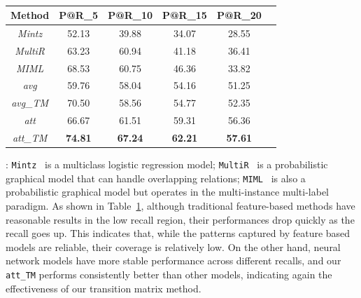 \begin{table}
\centering
\small{
\begin{tabular}{|c|c|c|c|c|c|}
\hline
\textbf{Method}							& \textbf{P@R\_5} 		& \textbf{P@R\_10} 			& \textbf{P@R\_15} & \textbf{P@R\_20} \\
\hline
\textit{Mintz} 							&52.13	&39.88	&34.07	&28.55 	\\
\hline
\textit{MultiR} 						&63.23	&60.94	&41.18	&36.41 	\\
\hline
\textit{MIML} 							&68.53	&60.75	&46.36	&33.82 	\\
\hline
\textit{avg} 								&59.76	&58.04	&54.16	&51.25 	\\
\hline
\textit{avg\_TM} 						&70.50	&58.56	&54.77	&52.35 	\\
\hline
\textit{att} 								&66.67	&61.51	&59.31	&56.36 	\\
\hline
\textit{att\_TM} 						&\textbf{74.81}	&\textbf{67.24}	&\textbf{62.21}	&\textbf{57.61} 	\\
\hline
\end{tabular}
}
\caption{}
\label{feature-based}
\end{table}

: \texttt{Mintz}~\cite{mintz2009distant} is a multiclass logistic regression model; \texttt{MultiR}~\cite{hoffmann2011knowledge} is a probabilistic graphical model that can handle overlapping relations; \texttt{MIML}~\cite{surdeanu2012multi} is also a probabilistic graphical model but operates in the multi-instance multi-label paradigm. As shown in Table~\ref{feature-based}, although traditional feature-based methods have reasonable results in the low recall region, their performances drop quickly as the recall goes up. This indicates that, while the patterns captured by feature based models are reliable, their coverage is relatively low. On the other hand, neural network models have more stable performance across different recalls, and our \texttt{att\_TM} performs consistently better than other models, indicating again the effectiveness of our transition matrix method.






